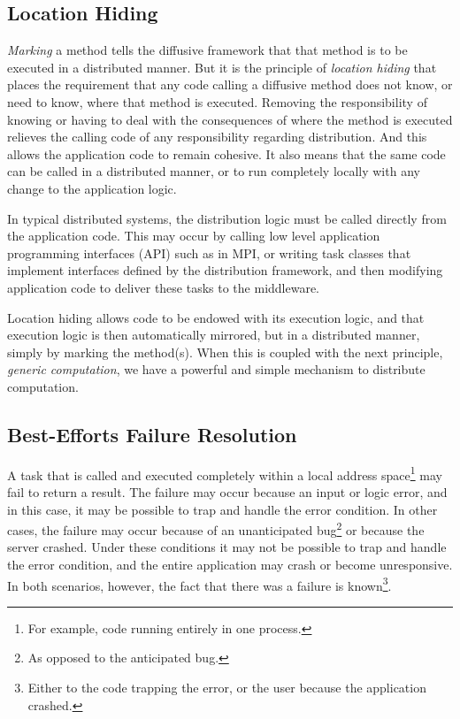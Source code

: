 \documentclass[11pt]{scrartcl}
\begin{document}
\subsection{Location Hiding\label{location_hiding}}
\emph{Marking} a method tells the diffusive framework that that method is to be executed in a distributed manner. But it is the principle of \emph{location hiding} that places the requirement that any code calling a diffusive method does not know, or need to know, where that method is executed. Removing the responsibility of knowing or having to deal with the consequences of where the method is executed relieves the calling code of any responsibility regarding distribution. And this allows the application code to remain cohesive. It also means that the same code can be called in a distributed manner, or to run completely locally with any change to the application logic.

In typical distributed systems, the distribution logic must be called directly from the application code. This may occur by calling low level application programming interfaces (API) such as in MPI, or writing task classes that implement interfaces defined by the distribution framework, and then modifying application code to deliver these tasks to the middleware.

Location hiding allows code to be endowed with its execution logic, and that execution logic is then automatically mirrored, but in a distributed manner, simply by marking the method(s). When this is coupled with the next principle, \emph{generic computation}, we have a powerful and simple mechanism to distribute computation.

\subsection{Best-Efforts Failure Resolution\label{sec:best_efforts_failure_resolution}}
A task that is called and executed completely within a local address space\footnote{For example, code running entirely in one process.} may fail to return a result. The failure may occur because an input or logic error, and in this case, it may be possible to trap and handle the error condition. In other cases, the failure may occur because of an unanticipated bug\footnote{As opposed to the anticipated bug.} or because the server crashed. Under these conditions it may not be possible to trap and handle the error condition, and the entire application may crash or become unresponsive. In both scenarios, however, the fact that there was a failure is known\footnote{Either to the code trapping the error, or the user because the application crashed.}.
\end{document}

